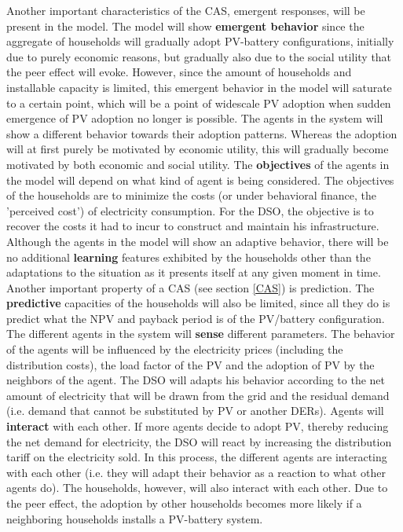 \newline \newline \noindent
Another  important characteristics of the CAS, emergent responses, will be present in the model. The model will show \textbf{emergent behavior} since the aggregate of households will gradually adopt PV-battery configurations, initially due to purely economic reasons, but gradually also due to the social utility that the peer effect will evoke. However, since the amount of households and installable capacity is limited, this emergent behavior in the model will saturate to a certain point, which will be a point of widescale PV adoption when sudden emergence of PV adoption no longer is possible. The agents in the system will show a different behavior towards their adoption patterns. Whereas the adoption will at first purely be motivated by economic utility, this will gradually become motivated by both economic and social utility.
\newline \newline \noindent
The \textbf{objectives} of the agents in the model will depend on what kind of agent is being considered. The objectives of the households are to minimize the costs (or under behavioral finance, the 'perceived cost') of  electricity consumption. For the DSO, the objective is to recover the costs it had to incur to construct and maintain his infrastructure. Although the agents in the model will show an adaptive behavior, there will be no additional \textbf{learning} features exhibited by the households other than the adaptations to the situation as it presents itself at any given moment in time. 
\newline \newline \noindent 
Another important property of a CAS (see section \ref{CAS}) is prediction. The \textbf{predictive} capacities of the households will also be limited, since all they do is predict what the NPV and payback period is of the PV/battery configuration. The different agents in the system will \textbf{sense} different parameters. The behavior of the agents will be influenced by the electricity prices (including the distribution costs), the load factor of the PV and the adoption of PV by the neighbors of the agent. The DSO will adapts his behavior according to the net amount of electricity that will be drawn from the grid and the residual demand (i.e. demand that cannot be substituted by PV or another DERs). 
\newline \newline \noindent
Agents will \textbf{interact} with each other. If more agents decide to adopt PV, thereby reducing the net demand for electricity, the DSO will react by increasing the distribution tariff on the electricity sold. In this process, the different agents are interacting with each other (i.e. they will adapt their behavior as a reaction to what other agents do). The households, however, will also interact with each other. Due to the peer effect, the adoption by other households becomes more likely if a neighboring households installs a PV-battery system. 

